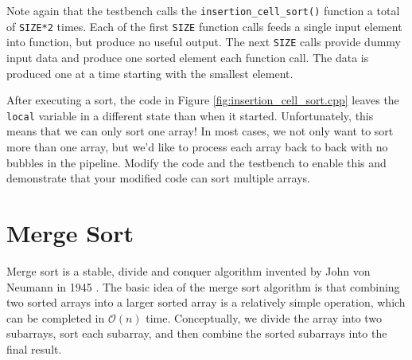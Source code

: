 Note again that the testbench calls the \lstinline{insertion_cell_sort()} function a total of \lstinline{SIZE*2} times. Each of the first \lstinline{SIZE} function calls feeds a single input element into function, but produce no useful output. The next \lstinline{SIZE} calls provide dummy input data and produce one sorted element each function call.  The data is produced one at a time starting with the smallest element.

\begin{exercise}
After executing a sort, the code in Figure \ref{fig:insertion_cell_sort.cpp} leaves the \lstinline{local} variable in a different state than when it started.  Unfortunately, this means that we can only sort one array! In most cases, we not only want to sort more than one array, but we'd like to process each array back to back with no bubbles in the pipeline.   Modify the code and the testbench to enable this and demonstrate that your modified code can sort multiple arrays.
\end{exercise}

\section{Merge Sort}
\label{sec:sort:merge}
Merge sort is a stable, divide and conquer algorithm invented by John von Neumann in 1945 \cite{knuth1998art}. The basic idea of the merge sort algorithm is that combining two sorted arrays into a larger sorted array is a relatively simple operation, which can be completed in $\mathcal{O}(n)$ time.    Conceptually, we divide the array into two subarrays, sort each subarray, and then combine the sorted subarrays into the final result. 

